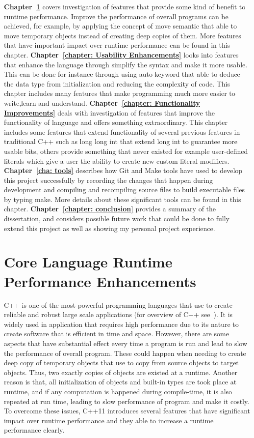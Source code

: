 \documentclass[11pt]{report}
\begin{document}
\textbf{Chapter~\ref{chapter: Runtime Performance Enhancements}} covers investigation of  features that provide some kind of benefit to runtime performance. Improve the performance of overall programs  can be achieved, for example, by applying the concept of move semantic that able to move temporary objects instead of creating deep copies of them. More  features that have important impact over runtime performance can be found in this chapter. \textbf{Chapter~\ref{chapter: Usability Enhancements}} looks into features  that enhance the language through simplify the syntax  and make it more usable. This can be done for instance through using auto keyword that able to deduce the data type from initialization and reducing the complexity of code. This chapter includes many features that make programming much more easier to write,learn and understand. \textbf{Chapter~\ref{chapter: Functionality Improvements}} deals with investigation of features that improve the functionality of language and offers something extraordinary. This chapter includes some features that extend functionality of several previous features in traditional C++  such as long long int that extend long int to guarantee more usable bits, others provide something that never existed for example user-defined literals which give a user the ability to create new custom literal modifiers. \textbf{Chapter~\ref{cha: tools}} describes how Git and Make tools have used to develop this project successfully by recording the changes that happen during development and compiling and recompiling source files to build executable files by typing make. More details about these significant tools can be found in this chapter. \textbf{Chapter~\ref{chapter: conclusion}} provides a summary of the dissertation, and considers possible future work that could be done to fully extend this project  as well as showing my personal project experience.


\chapter{Core Language Runtime Performance Enhancements}
\label{chapter: Runtime Performance Enhancements}
C++ is one of the most powerful programming languages that use to create reliable and robust large scale applications (for overview of C++ see~\cite{Stroustrup:2012:Cpp11}). It is widely used in application that requires high performance due to its nature to create software that is efficient in time and space. However, there are some aspects that have substantial effect every time a program is run and lead to slow the performance of overall program. These could happen when needing to create deep copy of temporary objects that use to copy from source objects to target objects. Thus, two exactly copies of objects are existed at a runtime. Another reason is that, all initialization of objects and built-in types are took place at runtime, and if any computation is happened during compile-time, it is also repeated at run time, leading to slow performance of program and make it costly. To overcome these issues, C++11 introduces several features that have significant impact over runtime performance and they able to increase a runtime performance clearly.
\end{document}
